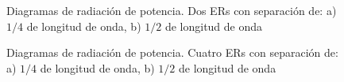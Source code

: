 \begin{figure}[H]
	\centering
	\caption{Diagramas de radiación de potencia. Dos ERs con separación de: a) $1/4$ de longitud de onda, b) $1/2$ de longitud de onda}
	\label{fig:twoArrayPat}
\end{figure}

\begin{figure}[H]
	\centering
	\caption{Diagramas de radiación de potencia. Cuatro ERs con separación de: a) $1/4$ de longitud de onda, b) $1/2$ de longitud
		de onda}
	\label{fig:fourArrayPat}
\end{figure}

